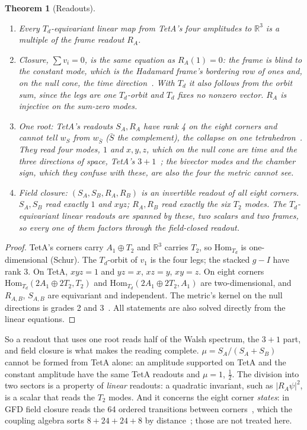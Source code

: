 \documentclass[twocolumn]{iopjournal}
\newtheorem{theorem}{Theorem}
\theoremstyle{definition}
\theoremstyle{remark}
\begin{document}
\begin{theorem}[Readouts]
\label{thm:closure}
\begin{enumerate}
\item[(i)] Every $T_d$-equivariant linear map from TetA's four amplitudes
  to $\mathbb R^3$ is a multiple of the frame readout $R_A$.
\item[(ii)] Closure, $\sum v_i = 0$, is the same equation as $R_A(1) = 0$:
  the frame is blind to the constant mode, which is the Hadamard frame's
  bordering row of ones and, on the null cone, the time
  direction~\cite{NelsonHadamard, NelsonCoupling}. With $T_d$ it also
  follows from the orbit sum, since the legs are one $T_d$-orbit and $T_d$
  fixes no nonzero vector. $R_A$ is injective on the sum-zero modes.
\item[(iii)] One root: TetA's readouts $S_A, R_A$ have rank 4 on the eight
  corners and cannot tell $w_S$ from $w_{\bar S}$ ($\bar S$ the
  complement), the collapse on one tetrahedron~\cite{NelsonHadamard}. They
  read four modes, $1$ and $x, y, z$, which on the null cone are time and
  the three directions of space, TetA's $3+1$~\cite{NelsonCoupling}; the
  bivector modes and the chamber sign, which they confuse with these, are
  also the four the metric cannot see.
\item[(iv)] Field closure: $(S_A, S_B, R_A, R_B)$ is an invertible readout
  of all eight corners. $S_A, S_B$ read exactly $1$ and $xyz$; $R_A, R_B$
  read exactly the six $T_2$ modes. The $T_d$-equivariant linear readouts
  are spanned by these, two scalars and two frames, so every one of them
  factors through the field-closed readout.
\end{enumerate}
\end{theorem}

\begin{proof}
TetA's corners carry $A_1 \oplus T_2$ and $\mathbb R^3$ carries $T_2$, so
$\mathrm{Hom}_{T_d}$ is one-dimensional (Schur). The $T_d$-orbit of $v_1$ is
the four legs; the stacked $g - I$ have rank 3. On TetA, $xyz = 1$ and $yz
= x$, $xz = y$, $xy = z$. On eight corners $\mathrm{Hom}_{T_d}(2A_1
\oplus 2T_2, T_2)$ and $\mathrm{Hom}_{T_d}(2A_1 \oplus 2T_2, A_1)$ are
two-dimensional, and $R_{A,B}$, $S_{A,B}$ are equivariant and independent.
The metric's kernel on the null directions is grades 2 and
3~\cite{NelsonCoupling}. All statements are also solved directly from the
linear equations.
\end{proof}

So a readout that uses one root reads half of the Walsh spectrum, the
$3+1$ part, and field closure is what makes the reading complete. $\mu =
S_A/(S_A + S_B)$ cannot be formed from TetA alone: an amplitude supported
on TetA and the constant amplitude have the same TetA readouts and $\mu =
1$, $\frac12$. The division into two sectors is a property of
\emph{linear} readouts: a quadratic invariant, such as $\lvert
R_A\psi\rvert^2$, is a scalar that reads the $T_2$ modes. And it concerns
the eight corner \emph{states}: in GFD field closure reads the 64 ordered
transitions between corners~\cite{NelsonFieldClosure}, which the coupling
algebra sorts $8 + 24 + 24 + 8$ by distance~\cite{NelsonCoupling}; those
are not treated here.
\end{document}
